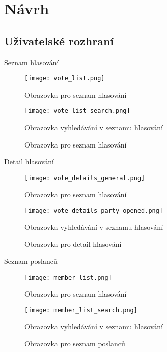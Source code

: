 \chapter{Návrh}

\setcounter{page}{1}

\section{Uživatelské rozhraní}

Seznam hlasování

\begin{figure}[h]
	\begin{minipage}{0.5\textwidth}
		\centering
		\texttt{[image: vote\_list.png]}
		\caption{Obrazovka pro seznam hlasování}
	\end{minipage}%
	\begin{minipage}{0.5\textwidth}
		\centering
		\texttt{[image: vote\_list\_search.png]}
		\caption{Obrazovka vyhledávání v seznamu hlasování}
	\end{minipage}
	\caption{Obrazovka pro seznam hlasování}
\end{figure}

Detail hlasování

\begin{figure}[h]
	\begin{minipage}{0.5\textwidth}
		\centering
		\texttt{[image: vote\_details\_general.png]}
		\caption{Obrazovka pro seznam hlasování}
	\end{minipage}%
	\begin{minipage}{0.5\textwidth}
		\centering
		\texttt{[image: vote\_details\_party\_opened.png]}
		\caption{Obrazovka vyhledávání v seznamu hlasování}
	\end{minipage}
	\caption{Obrazovka pro detail hlasování}
\end{figure}

Seznam poslanců

\begin{figure}[h]
	\begin{minipage}{0.5\textwidth}
		\centering
		\texttt{[image: member\_list.png]}
		\caption{Obrazovka pro seznam hlasování}
	\end{minipage}%
	\begin{minipage}{0.5\textwidth}
		\centering
		\texttt{[image: member\_list\_search.png]}
		\caption{Obrazovka vyhledávání v seznamu hlasování}
	\end{minipage}
	\caption{Obrazovka pro seznam poslanců}
\end{figure}

